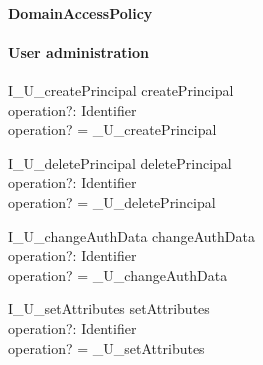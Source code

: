 \paragraph{DomainAccessPolicy}


\paragraph{User administration}
\begin{zedgroup}
\begin{schema}{I\_U\_createPrincipal}
  createPrincipal \\
  operation?: Identifier \\
  \where
  operation? = \_U\_createPrincipal \\
\end{schema}
\begin{schema}{I\_U\_deletePrincipal}
  deletePrincipal \\
  operation?: Identifier \\
  \where
  operation? = \_U\_deletePrincipal \\
\end{schema}
\begin{schema}{I\_U\_changeAuthData}
  changeAuthData \\
  operation?: Identifier \\
  \where
  operation? = \_U\_changeAuthData \\
\end{schema}
\begin{schema}{I\_U\_setAttributes}
  setAttributes \\
  operation?: Identifier \\
  \where
  operation? = \_U\_setAttributes \\
\end{schema}
\end{zedgroup}


